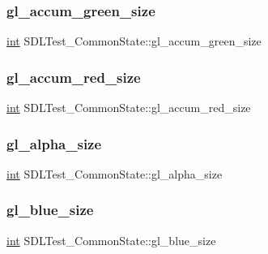 \subsubsection{\texorpdfstring{gl\_accum\_green\_size}{gl\_accum\_green\_size}}
{\footnotesize\ttfamily \mbox{\hyperlink{warnings_8h_a74f207b5aa4ba51c3a2ad59b219a423b}{int}} S\+D\+L\+Test\+\_\+\+Common\+State\+::gl\+\_\+accum\+\_\+green\+\_\+size}

\mbox{\label{struct_s_d_l_test___common_state_ae9d55cebbc3f4e486f4f77a35de4e4dd}} 
\subsubsection{\texorpdfstring{gl\_accum\_red\_size}{gl\_accum\_red\_size}}
{\footnotesize\ttfamily \mbox{\hyperlink{warnings_8h_a74f207b5aa4ba51c3a2ad59b219a423b}{int}} S\+D\+L\+Test\+\_\+\+Common\+State\+::gl\+\_\+accum\+\_\+red\+\_\+size}

\mbox{\label{struct_s_d_l_test___common_state_a2b6e86fd695d84f12db148dcf3b2fcb5}} 
\subsubsection{\texorpdfstring{gl\_alpha\_size}{gl\_alpha\_size}}
{\footnotesize\ttfamily \mbox{\hyperlink{warnings_8h_a74f207b5aa4ba51c3a2ad59b219a423b}{int}} S\+D\+L\+Test\+\_\+\+Common\+State\+::gl\+\_\+alpha\+\_\+size}

\mbox{\label{struct_s_d_l_test___common_state_aff43a763af98b8eb651c41ec931e5d93}} 
\subsubsection{\texorpdfstring{gl\_blue\_size}{gl\_blue\_size}}
{\footnotesize\ttfamily \mbox{\hyperlink{warnings_8h_a74f207b5aa4ba51c3a2ad59b219a423b}{int}} S\+D\+L\+Test\+\_\+\+Common\+State\+::gl\+\_\+blue\+\_\+size}


